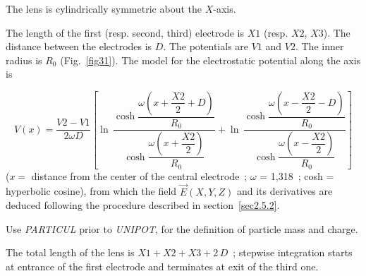 {The lens is cylindrically symmetric about the $ X$-axis.  
\medskip

\noindent The length of the first (resp. second, third) electrode is $ X1 $
(resp. $ X2$, $X3$). The distance between the electrodes is $ D$.  
The potentials are $ V1 $ and $V2$.  The inner radius is $ R_0 $ (Fig.~\ref{fig31}).  
The model for the electrostatic potential along the axis is~\cite{Biblio19}  %

$$ V(x) = 
    \dfrac{V2-V1 }{ 2\omega D} \left[
    \ln\, \dfrac{\cosh 
    	\dfrac{\omega \left(x+ \dfrac{X2}{ 2}+D \right) }{ R_0} }{
       \cosh \dfrac{\omega \left(x+\dfrac{X2 }{ 2}\right) }{ R_0}}  
    + \ln\,  \dfrac{\cosh \dfrac{\omega \left(x-\dfrac{X2 }{ 2}-D\right) }{R_0} }{
       \cosh \dfrac{\omega \left(x-\dfrac{X2 }{ 2}\right) }{R_0} }
     \right] $$
%
($ x  = $ distance from the center of the central electrode~;
$\omega$  = 1,318~; cosh = hyperbolic cosine), from which the field $ \vec  E(X,Y,Z) $ and its
derivatives are deduced following the procedure described in section~\ref{sec2.5.2}. 

\medskip

\noindent Use \textsl{PARTICUL} prior to \textsl{UNIPOT}, for the
 definition of particle mass and charge.

\medskip

\noindent The total length of the lens is $X1+X2+X3+2\,D$~; stepwise integration starts 
at entrance of the first electrode and terminates at exit of the third one. 

\vfill

}
